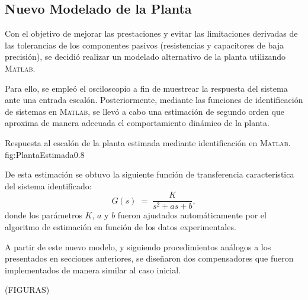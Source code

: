 \subsection{Nuevo Modelado de la Planta}

Con el objetivo de mejorar las prestaciones y evitar las limitaciones derivadas de las tolerancias de los componentes pasivos (resistencias y capacitores de baja precisión), se decidió realizar un modelado alternativo de la planta utilizando \textsc{Matlab}.

Para ello, se empleó el osciloscopio a fin de muestrear la respuesta del sistema ante una entrada escalón. Posteriormente, mediante las funciones de identificación de sistemas en \textsc{Matlab}, se llevó a cabo una estimación de segundo orden que aproxima de manera adecuada el comportamiento dinámico de la planta.  

{Respuesta al escalón de la planta estimada mediante identificación en \textsc{Matlab}.}
{fig:PlantaEstimada}{0.8}

De esta estimación se obtuvo la siguiente función de transferencia característica del sistema identificado:
\begin{equation}
	G(s) \;=\; \frac{K}{s^2 + a s + b},
\end{equation}
donde los parámetros $K$, $a$ y $b$ fueron ajustados automáticamente por el algoritmo de estimación en función de los datos experimentales.  

A partir de este nuevo modelo, y siguiendo procedimientos análogos a los presentados en secciones anteriores, se diseñaron dos compensadores que fueron implementados de manera similar al caso inicial.

(FIGURAS)
